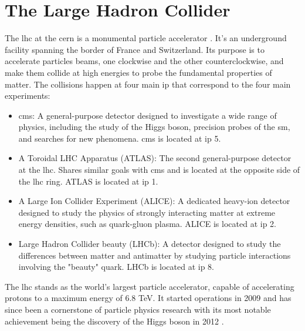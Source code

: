 \section{The Large Hadron Collider}
\label{subsec:lhc}


The \acrfull{lhc} at the \acrfull{cern} is a monumental particle accelerator \cite{lhc}. It's an underground facility spanning the border of France and Switzerland. Its purpose is to accelerate particles beams, one clockwise and the other counterclockwise, and make them collide at high energies to probe the fundamental properties of matter. The collisions happen at four main \acrfull{ip} that correspond to the four main experiments:
\begin{itemize}
	\item \acrfull{cms}: A general-purpose detector designed to investigate a wide range of physics, including the study of the Higgs boson, precision probes of the \acrshort{sm}, and searches for new phenomena. \acrshort{cms} is located at \acrshort{ip} 5.
	\item A Toroidal LHC Apparatus (ATLAS): The second general-purpose detector at the \acrshort{lhc}. Shares similar goals with \acrshort{cms} and is located at the opposite side of the \acrshort{lhc} ring. ATLAS is located at \acrshort{ip} 1.
	\item A Large Ion Collider Experiment (ALICE): A dedicated heavy-ion detector designed to study the physics of strongly interacting matter at extreme energy densities, such as quark-gluon plasma. ALICE is located at \acrshort{ip} 2.
	\item Large Hadron Collider beauty (LHCb): A detector designed to study the differences between matter and antimatter by studying particle interactions involving the "beauty" quark. LHCb is located at \acrshort{ip} 8.
\end{itemize}

The \acrshort{lhc} stands as the world's largest particle accelerator, capable of accelerating protons to a maximum energy of 6.8 TeV. It started operations in 2009 and has since been a cornerstone of particle physics research with its most notable achievement being the discovery of the Higgs boson in 2012 \cite{HiggsDiscovery}.


